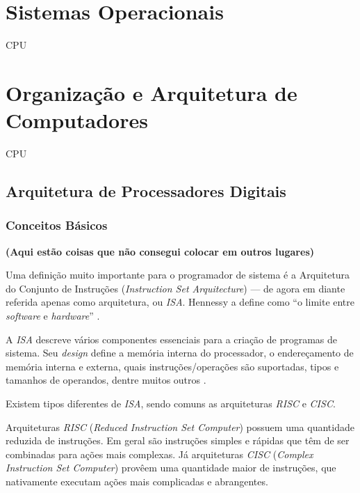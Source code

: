 \section{Sistemas Operacionais}
\label{sec:so}

CPU

\section{Organização e Arquitetura de Computadores}

CPU

\subsection{Arquitetura de Processadores Digitais}
\label{subsec:apd}

\subsubsection{Conceitos Básicos}

\textbf{(Aqui estão coisas que não consegui colocar em outros lugares)}


Uma definição muito importante para o programador de sistema é a Arquitetura do
Conjunto de Instruções (\textit{Instruction Set Arquitecture}) --- de agora em
diante referida apenas como arquitetura, ou \textit{ISA}. Hennessy a define como
``o limite entre \textit{software} e \textit{hardware}'' \cite{hennessy}.

A \textit{ISA} descreve vários componentes essenciais para a criação de
programas de sistema. Seu \textit{design} define a memória interna do
processador, o endereçamento de memória interna e externa, quais
instruções/operações são suportadas, tipos e tamanhos de operandos, dentre
muitos outros  \cite{patterson}.

Existem tipos diferentes de \textit{ISA}, sendo comuns as arquiteturas
\textit{RISC} e \textit{CISC}.

Arquiteturas \textit{RISC} (\textit{Reduced Instruction Set Computer}) possuem
uma quantidade reduzida de instruções. Em geral são instruções simples e rápidas
que têm de ser combinadas para ações mais complexas. Já arquiteturas
\textit{CISC} (\textit{Complex Instruction Set Computer}) provêem uma quantidade
maior de instruções, que nativamente executam ações mais complicadas e
abrangentes.

